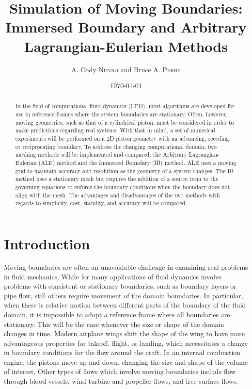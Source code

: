 \documentclass{article}
\title{Simulation of Moving Boundaries: Immersed Boundary and Arbitrary Lagrangian-Eulerian Methods} %
\author{A. Cody \textsc{Nunno} and Bruce A. \textsc{Perry}} %
\date{\today} %
\begin{document}
\maketitle %


\begin{abstract}
  In the field of computational fluid dynamics (CFD), most algorithms are developed for use in reference frames where the system boundaries are stationary.  Often, however, moving geometries, such as that of a cylindrical piston, must be considered in order to make predictions regarding real systems.  With that in mind, a set of numerical experiments will be performed on a 2D piston geometry with an advancing, receding, or reciprocating boundary.  To address the changing computational domain, two meshing methods will be implemented and compared: the Arbitrary Lagrangian-Eulerian (ALE) method and the Immersed Boundary (IB) method.  ALE uses a moving grid to maintain accuracy and resolution as the geometry of a system changes.  The IB method uses a stationary mesh but requires the addition of a source term to the governing equations to enforce the boundary conditions when the boundary does not align with the mesh. The advantages and disadvantages of the two methods with regards to simplicity, cost, stability, and accuracy will be compared.
\end{abstract}


\section{Introduction}

Moving boundaries are often an unavoidable challenge in examining real problems in fluid mechanics.  While for many applications of fluid dynamics involve problems with consistent or stationary boundaries, such as boundary layers or pipe flow, still others require movement of the domain boundaries. In particular, when there is relative motion between different parts of the boundary of the fluid domain, it is impossible to adopt a reference frame where all boundaries are stationary. This will be the case whenever the size or shape of the domain changes in time.  Modern airplane wings shift the shape of the wing to have more advantageous properties for takeoff, flight, or landing, which necessitates a change in boundary conditions for the flow around the craft.  In an internal combustion engine, the pistons move up and down, changing the size and shape of the volume of interest. Other types of flows which involve moving boundaries include flow through blood vessels, wind turbine and propeller flows, and free surface flows. \\
\end{document}
